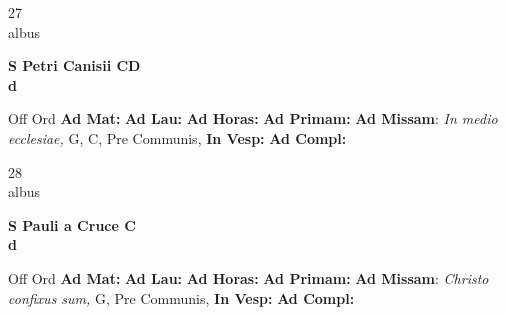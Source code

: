 \documentclass[10pt, openany]{book}
\begin{document}
    \begin{center}
        \begin{minipage}{3.5in}
            \vspace{2em}
            \begin{minipage}{0.5in}
                {\Huge 27} \\
                {\normalsize albus}
            \end{minipage}
            \begin{minipage}{3.0in}
                \textbf{ \large S Petri Canisii CD \\
                \textnormal{\normalsize d}}

            \end{minipage}
            \begin{justify}Off Ord
                \textbf{Ad Mat: }
                \textbf{Ad Lau: }
                \textbf{Ad Horas: }
                \textbf{Ad Primam: }\textbf{Ad Missam}: \textit{In medio ecclesiae,} G, C, Pre Communis, 
                \textbf{In Vesp: }
                \textbf{Ad Compl: }
            \end{justify}
        \end{minipage}
    \end{center}

    \begin{center}
        \begin{minipage}{3.5in}
            \vspace{2em}
            \begin{minipage}{0.5in}
                {\Huge 28} \\
                {\normalsize albus}
            \end{minipage}
            \begin{minipage}{3.0in}
                \textbf{ \large S Pauli a Cruce C \\
                \textnormal{\normalsize d}}

            \end{minipage}
            \begin{justify}Off Ord
                \textbf{Ad Mat: }
                \textbf{Ad Lau: }
                \textbf{Ad Horas: }
                \textbf{Ad Primam: }\textbf{Ad Missam}: \textit{Christo confixus sum,} G, Pre Communis, 
                \textbf{In Vesp: }
                \textbf{Ad Compl: }
            \end{justify}
        \end{minipage}
    \end{center}
\end{document}
